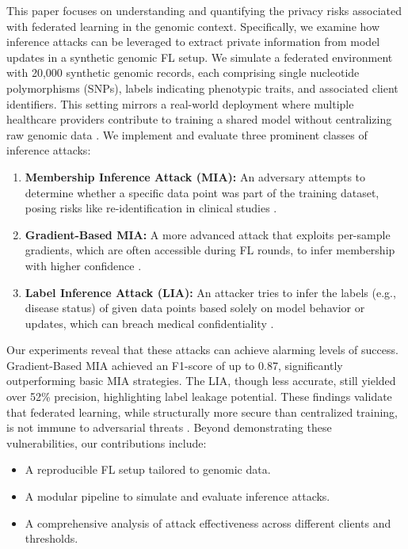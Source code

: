 \documentclass[conference]{IEEEtran}
\begin{document}
This paper focuses on understanding and quantifying the privacy risks associated with federated learning in the genomic context. Specifically, we examine how inference attacks can be leveraged to extract private information from model updates in a synthetic genomic FL setup. We simulate a federated environment with 20,000 synthetic genomic records, each comprising single nucleotide polymorphisms (SNPs), labels indicating phenotypic traits, and associated client identifiers. This setting mirrors a real-world deployment where multiple healthcare providers contribute to training a shared model without centralizing raw genomic data \cite{genome2023interpretation6}.
\newline
\newline
We implement and evaluate three prominent classes of inference attacks:
\begin{enumerate}
    \item \textbf{Membership Inference Attack (MIA):} An adversary attempts to determine whether a specific data point was part of the training dataset, posing risks like re-identification in clinical studies \cite{bai2024membership4}\cite{suri2023subject7}.
    \item \textbf{Gradient-Based MIA:} A more advanced attack that exploits per-sample gradients, which are often accessible during FL rounds, to infer membership with higher confidence \cite{gbmia2023gradient5}.
    \item \textbf{Label Inference Attack (LIA):} An attacker tries to infer the labels (e.g., disease status) of given data points based solely on model behavior or updates, which can breach medical confidentiality \cite{label2022inference8}.
\end{enumerate}

Our experiments reveal that these attacks can achieve alarming levels of success. Gradient-Based MIA achieved an F1-score of up to 0.87, significantly outperforming basic MIA strategies. The LIA, though less accurate, still yielded over 52\% precision, highlighting label leakage potential. These findings validate that federated learning, while structurally more secure than centralized training, is not immune to adversarial threats \cite{bai2024membership4}\cite{gbmia2023gradient5}\cite{label2022inference8}.
\newline
Beyond demonstrating these vulnerabilities, our contributions include:
\begin{itemize}
    \item A reproducible FL setup tailored to genomic data.
    \item A modular pipeline to simulate and evaluate inference attacks.
    \item A comprehensive analysis of attack effectiveness across different clients and thresholds.
\end{itemize}
\end{document}

